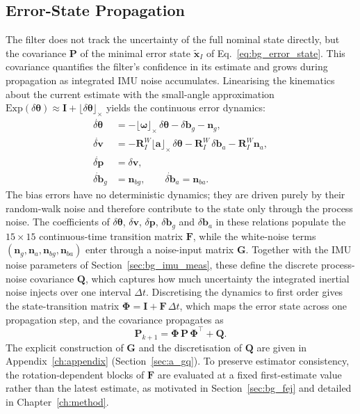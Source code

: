 \subsection{Error-State Propagation}
\label{sec:bg_imu_error}
The filter does not track the uncertainty of the full nominal state directly, but the covariance $\mathbf{P}$ of the minimal error state $\tilde{\mathbf{x}}_I$ of Eq.~\ref{eq:bg_error_state}. This covariance quantifies the filter's confidence in its estimate and grows during propagation as integrated IMU noise accumulates. Linearising the kinematics about the current estimate with the small-angle approximation $\mathrm{Exp}(\delta\boldsymbol{\theta}) \approx \mathbf{I} + \lfloor\delta\boldsymbol{\theta}\rfloor_\times$ yields the continuous error dynamics:
\begin{align}
  \dot{\delta\boldsymbol{\theta}} &= -\lfloor\boldsymbol{\omega}\rfloor_\times\,\delta\boldsymbol{\theta} - \delta\mathbf{b}_g - \mathbf{n}_g, \\
  \dot{\delta\mathbf{v}} &= -\mathbf{R}_I^W\lfloor\mathbf{a}\rfloor_\times\,\delta\boldsymbol{\theta} - \mathbf{R}_I^W\,\delta\mathbf{b}_a - \mathbf{R}_I^W\mathbf{n}_a, \\
  \dot{\delta\mathbf{p}} &= \delta\mathbf{v}, \\
  \dot{\delta\mathbf{b}}_g &= \mathbf{n}_{bg}, \qquad \dot{\delta\mathbf{b}}_a = \mathbf{n}_{ba}.
\end{align}
The bias errors have no deterministic dynamics; they are driven purely by their random-walk noise and therefore contribute to the state only through the process noise. The coefficients of $\delta\boldsymbol{\theta}$, $\delta\mathbf{v}$, $\delta\mathbf{p}$, $\delta\mathbf{b}_g$ and $\delta\mathbf{b}_a$ in these relations populate the $15\times15$ continuous-time transition matrix $\mathbf{F}$, while the white-noise terms $(\mathbf{n}_g, \mathbf{n}_a, \mathbf{n}_{bg}, \mathbf{n}_{ba})$ enter through a noise-input matrix $\mathbf{G}$. Together with the IMU noise parameters of Section~\ref{sec:bg_imu_meas}, these define the discrete process-noise covariance $\mathbf{Q}$, which captures how much uncertainty the integrated inertial noise injects over one interval $\Delta t$. Discretising the dynamics to first order gives the state-transition matrix $\boldsymbol{\Phi} = \mathbf{I} + \mathbf{F}\,\Delta t$, which maps the error state across one propagation step, and the covariance propagates as
\begin{equation}
  \mathbf{P}_{k+1} = \boldsymbol{\Phi}\,\mathbf{P}\,\boldsymbol{\Phi}^\top + \mathbf{Q}.
\end{equation}
The explicit construction of $\mathbf{G}$ and the discretisation of $\mathbf{Q}$ are given in Appendix~\ref{ch:appendix} (Section~\ref{sec:a_gq}). To preserve estimator consistency, the rotation-dependent blocks of $\mathbf{F}$ are evaluated at a fixed first-estimate value rather than the latest estimate, as motivated in Section~\ref{sec:bg_fej} and detailed in Chapter~\ref{ch:method}.

